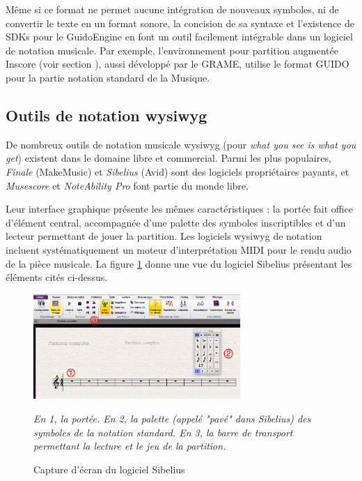 Même si ce format ne permet aucune intégration de nouveaux symboles, ni de convertir le texte en un format sonore, la concision de sa syntaxe et l'existence de SDKs pour le GuidoEngine en font un outil facilement intégrable dans un logiciel de notation musicale. Par exemple, l'environnement pour partition augmentée Inscore (voir section ), aussi développé par le GRAME, utilise le format GUIDO pour la partie notation standard de la Musique.    

\subsection{Outils de notation wysiwyg}
\label{subsec:outilsWysiwyg}

De nombreux outils de notation musicale wysiwyg (pour \textit{what you see is what you get}) existent dans le domaine libre et commercial. Parmi les plus populaires, \textit{Finale} (MakeMusic) et \textit{Sibelius} (Avid) sont des logiciels propriétaires payants, et \textit{Musescore} et \textit{NoteAbility Pro} font partie du monde libre.

Leur interface graphique présente les mêmes caractéristiques : la portée fait office d'élément central, accompagnée d'une palette des symboles inscriptibles et d'un lecteur permettant de jouer la partition.
Les logiciels wysiwyg de notation incluent systématiquement un moteur d'interprétation MIDI pour le rendu audio de la pièce musicale.
La figure \ref{fig:sibeliusScreenshot} donne une vue du logiciel Sibelius présentant les éléments cités ci-dessus.

\begin{figure}[H]
	\centering
	\includegraphics[keepaspectratio=true, width=0.7\textwidth]{OutilsInformatiques/i/sibeliusScreenshot.png}
	\caption{Capture d'écran du logiciel Sibelius}
	\label{fig:sibeliusScreenshot}
	\small \it
	En 1, la portée. En 2, la palette (appelé "pavé" dans Sibelius) des symboles de la notation standard.
	En 3, la barre de transport permettant la lecture et le jeu de la partition. 			
\end{figure}

